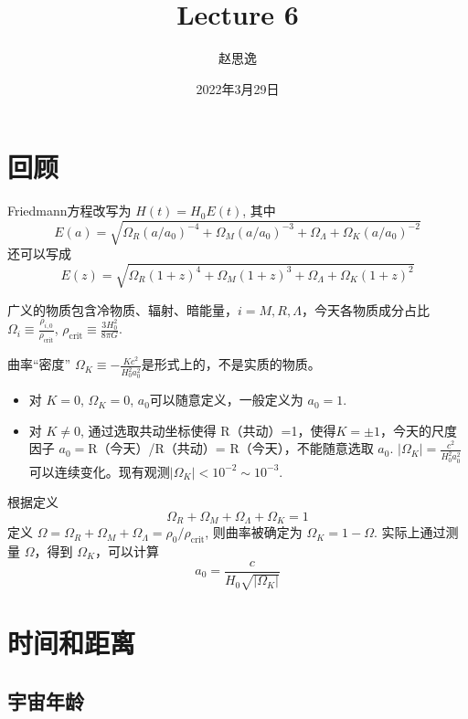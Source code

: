 \documentclass[12pt]{ctexart}
\title{Lecture 6}
\author{赵思逸}
\date{2022年3月29日}
\begin{document}
\maketitle


\section{回顾}

Friedmann方程改写为 $H(t)= H_0 E(t)$,   其中 
\begin{equation}
    E(a)=\sqrt{\Omega_R(a/a_0)^{-4}+\Omega_M(a/a_0)^{-3}+\Omega_\Lambda+\Omega_K(a/a_0)^{-2}}
\end{equation}
还可以写成
\begin{equation}
    E(z)=\sqrt{\Omega_R(1+z)^{4}+\Omega_M(1+z)^{3}+\Omega_\Lambda+\Omega_K(1+z)^{2}}
\end{equation}

广义的物质包含冷物质、辐射、暗能量，$i=M,R,\Lambda$，今天各物质成分占比 $\Omega_i\equiv\frac{\rho_{i,0}}{\rho_\text{crit}}$, $\rho_\text{crit}\equiv\frac{3H_0^2}{8\pi G}$.

曲率“密度” $\Omega_K\equiv-\frac{Kc^2}{H_0^2a_0^2}$是形式上的，不是实质的物质。
\begin{itemize}
    \item 对 $K=0$, $\Omega_K=0$, $a_0$可以随意定义，一般定义为 $a_0=1$.
    \item 对 $K\neq0$, 通过选取共动坐标使得 R（共动）=1，使得$K=\pm 1$，今天的尺度因子 $a_0=$R（今天）/R（共动）= R（今天），不能随意选取 $a_0$. $|\Omega_K|=\frac{c^2}{H_0^2a_0^2}$ 可以连续变化。现有观测$|\Omega_K|< 10^{-2}\sim 10^{-3}$.
\end{itemize} 

根据定义
\begin{equation}
    \Omega_R + \Omega_M + \Omega_\Lambda + \Omega_K = 1 \label{eq:allOmega}
\end{equation}
定义 $\Omega=\Omega_R + \Omega_M + \Omega_\Lambda = \rho_0/\rho_\text{crit}$, 则曲率被确定为 $\Omega_K = 1-\Omega$.  实际上通过测量 $\Omega$，得到 $\Omega_K$，可以计算
\begin{equation}
    a_0=\frac{c}{H_0\sqrt{|\Omega_K|}} 
\end{equation} 

\section{时间和距离}
\subsection{宇宙年龄}
\end{document}
